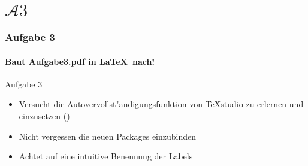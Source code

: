 \section{$\mathcal{A}3$} 
\begin{frame}
\frametitle{Aufgabe 3}
\framesubtitle{Baut Aufgabe3.pdf in \LaTeX ~nach!} 

\begin{block}{Aufgabe 3}
\begin{itemize}
\item Versucht die Autovervollst"andigungsfunktion von TeXstudio zu erlernen und einzusetzen
{\footnotesize(\keys{\ctrl + \SPACE})}
\item Nicht vergessen die neuen Packages einzubinden 
\item Achtet auf eine intuitive Benennung der Labels
\end{itemize}
\end{block}
\end{frame}
